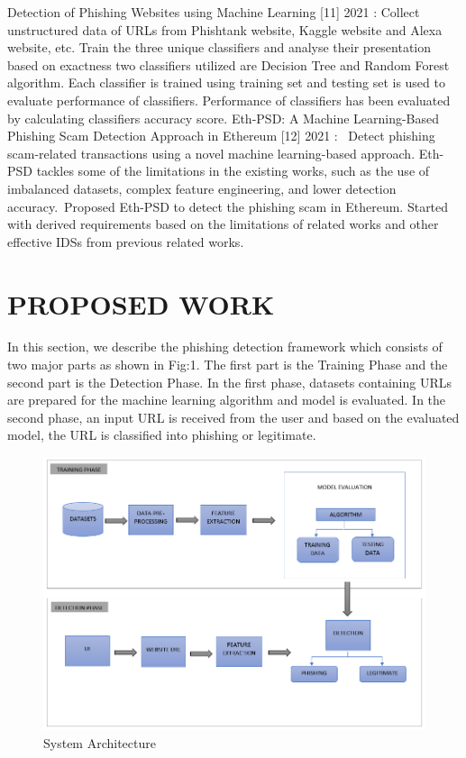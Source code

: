\documentclass[conference]{IEEEtran}
\begin{document}
\hspace{.2cm} Detection of Phishing Websites using Machine Learning [11] 2021 : Collect unstructured data of URLs from Phishtank website, Kaggle website and Alexa website, etc.
Train the three unique classifiers and analyse their presentation based on exactness two classifiers utilized are Decision Tree and Random Forest algorithm. Each classifier is trained using training set and testing set is used to evaluate performance of classifiers.
Performance of classifiers has been evaluated by calculating classifiers accuracy score.  Eth-PSD: A Machine Learning-Based Phishing Scam Detection Approach in Ethereum
[12] 2021 :  Detect phishing scam-related transactions using a novel machine learning-based approach. Eth-PSD tackles some of the limitations in the existing works, such as the use of imbalanced datasets, complex feature engineering, and lower detection accuracy. Proposed Eth-PSD to detect the phishing scam in Ethereum. Started with derived requirements based on the limitations of related works and other effective IDSs from previous related works.





\section{PROPOSED WORK}

\par In this section, we describe the phishing detection
framework which consists of two major parts as shown in Fig:1. The first part is the Training Phase and the second part is the Detection Phase. In
the first phase, datasets containing URLs are prepared for the machine learning algorithm and model is evaluated. In the second phase, an input URL is received from the user and based on the evaluated model, the URL is classified into phishing or legitimate.

\begin{figure}[H]
\centerline{\includegraphics[scale=0.3]{newModel.png}}
\caption{System Architecture}
\label{fig}
\end{figure}
\end{document}
